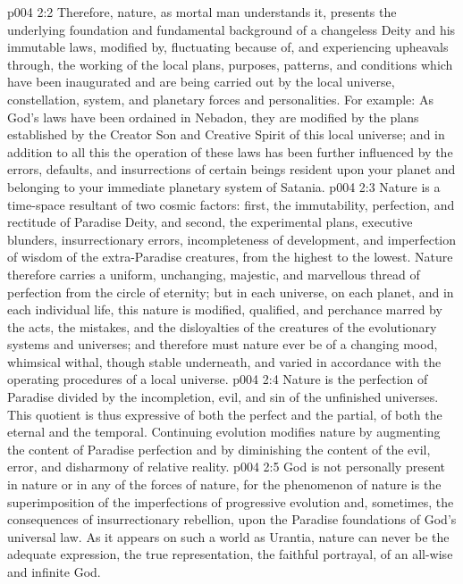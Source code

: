 \vs p004 2:2 Therefore, nature, as mortal man understands it, presents the underlying foundation and fundamental background of a changeless Deity and his immutable laws, modified by, fluctuating because of, and experiencing upheavals through, the working of the local plans, purposes, patterns, and conditions which have been inaugurated and are being carried out by the local universe, constellation, system, and planetary forces and personalities. For example: As God’s laws have been ordained in Nebadon, they are modified by the plans established by the Creator Son and Creative Spirit of this local universe; and in addition to all this the operation of these laws has been further influenced by the errors, defaults, and insurrections of certain beings resident upon your planet and belonging to your immediate planetary system of Satania.
\vs p004 2:3 \pc Nature is a time\hyp{}space resultant of two cosmic factors: first, the immutability, perfection, and rectitude of Paradise Deity, and second, the experimental plans, executive blunders, insurrectionary errors, incompleteness of development, and imperfection of wisdom of the extra\hyp{}Paradise creatures, from the highest to the lowest. Nature therefore carries a uniform, unchanging, majestic, and marvellous thread of perfection from the circle of eternity; but in each universe, on each planet, and in each individual life, this nature is modified, qualified, and perchance marred by the acts, the mistakes, and the disloyalties of the creatures of the evolutionary systems and universes; and therefore must nature ever be of a changing mood, whimsical withal, though stable underneath, and varied in accordance with the operating procedures of a local universe.
\vs p004 2:4 Nature is the perfection of Paradise divided by the incompletion, evil, and sin of the unfinished universes. This quotient is thus expressive of both the perfect and the partial, of both the eternal and the temporal. Continuing evolution modifies nature by augmenting the content of Paradise perfection and by diminishing the content of the evil, error, and disharmony of relative reality.
\vs p004 2:5 \pc God is not personally present in nature or in any of the forces of nature, for the phenomenon of nature is the superimposition of the imperfections of progressive evolution and, sometimes, the consequences of insurrectionary rebellion, upon the Paradise foundations of God’s universal law. As it appears on such a world as Urantia, nature can never be the adequate expression, the true representation, the faithful portrayal, of an all\hyp{}wise and infinite God.
